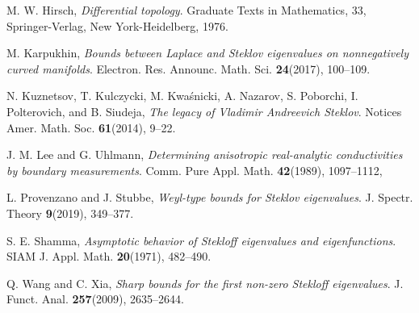 \documentclass{CUP-JNL-FMP}%
\theoremstyle{definition}
\numberwithin{equation}{section}
\begin{document}
\begin{Backmatter}
\begin{thebibliography}{99}
M. W. Hirsch, \emph{Differential topology}. Graduate Texts in Mathematics,  33, Springer-Verlag, New York-Heidelberg, 1976.

M. Karpukhin, \emph{Bounds between {L}aplace and {S}teklov eigenvalues on	nonnegatively curved manifolds}. Electron. Res. Announc. Math. Sci. \textbf{24}(2017),  100--109. 

N. Kuznetsov, T. Kulczycki, M. Kwa\'snicki, A. Nazarov,   S. Poborchi, I. Polterovich,  and B. Siudeja, \emph{The legacy of {V}ladimir {A}ndreevich {S}teklov}. Notices Amer. Math. Soc. \textbf{61}(2014), 9--22. 

J. M. Lee  and G. Uhlmann, \emph{Determining anisotropic real-analytic conductivities by boundary measurements}. Comm. Pure Appl. Math. \textbf{42}(1989), 1097--1112, 

L. Provenzano  and J. Stubbe, \emph{Weyl-type bounds for {S}teklov eigenvalues}. J. Spectr. Theory \textbf{9}(2019), 349--377. 

S. E.	Shamma, \emph{Asymptotic behavior of {S}tekloff eigenvalues and	eigenfunctions}. SIAM J. Appl. Math. \textbf{20}(1971), 482--490. 

Q. Wang and C. Xia, \emph{Sharp bounds for the first non-zero {S}tekloff eigenvalues}. J. Funct. Anal. \textbf{257}(2009), 2635--2644.	

\end{thebibliography}

\end{Backmatter}
\end{document}
